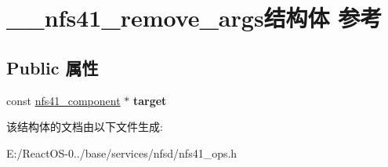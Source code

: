 \hypertarget{struct____nfs41__remove__args}{}\section{\+\_\+\+\_\+nfs41\+\_\+remove\+\_\+args结构体 参考}
\label{struct____nfs41__remove__args}
\subsection*{Public 属性}
\begin{DoxyCompactItemize}
\item 
\mbox{\label{struct____nfs41__remove__args_a8d10d60506b0c54eaac0a59e7fc16edd}} 
const \hyperlink{struct____nfs41__component}{nfs41\+\_\+component} $\ast$ {\bfseries target}
\end{DoxyCompactItemize}


该结构体的文档由以下文件生成\+:\begin{DoxyCompactItemize}
\item 
E\+:/\+React\+O\+S-\/0../base/services/nfsd/nfs41\+\_\+ops.\+h\end{DoxyCompactItemize}
